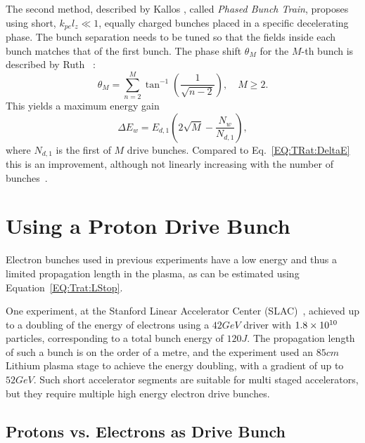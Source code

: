 The second method, described by Kallos \etal, called \textit{Phased Bunch Train}, proposes using short, $k_{pe}l_{z} \ll 1$, equally charged bunches placed in a specific decelerating phase.
The bunch separation needs to be tuned so that the fields inside each bunch matches that of the first bunch.
The phase shift $\theta_{M}$ for the $M$-th bunch is described by Ruth \etal~\cite{ruth:1985}:
\begin{equation}
    \theta_{M} = \sum^{M}_{n=2}\tan^{-1}\left(\frac{1}{\sqrt{n-2}}\right),\quad M \geq 2. \label{EQ:TrainPhase}
\end{equation}
This yields a maximum energy gain
\begin{equation}
    \Delta E_{w} = E_{d,1}\left(2\sqrt{M}-\frac{N_{w}}{N_{d,1}}\right), \label{EQ:TrainPhaseMaxE}
\end{equation}
where $N_{d,1}$ is the first of $M$ drive bunches.
Compared to Eq.~\ref{EQ:TRat:DeltaE} this is an improvement, although not linearly increasing with the number of bunches~\cite{ruth:1985}.

\section{Using a Proton Drive Bunch}
\label{Int:DBeam}

Electron bunches used in previous experiments have a low energy and thus a limited propagation length in the plasma, as can be estimated using Equation~\ref{EQ:Trat:LStop}.

One experiment, at the Stanford Linear Accelerator Center (SLAC)~\cite{blumenfeld:2007}, achieved up to a doubling of the energy of electrons using a $42\unit{GeV}$ driver with $1.8\times 10^{10}$ particles, corresponding to a total bunch energy of $120\unit{J}$.
The propagation length of such a bunch is on the order of a metre, and the experiment used an $85\unit{cm}$ Lithium plasma stage to achieve the energy doubling, with a gradient of up to $52\unit{GeV}$.
Such short accelerator segments are suitable for multi staged accelerators, but they require multiple high energy electron drive bunches. 

\subsection{Protons vs. Electrons as Drive Bunch}
\label{Int:DBeam:PDPWFA}

